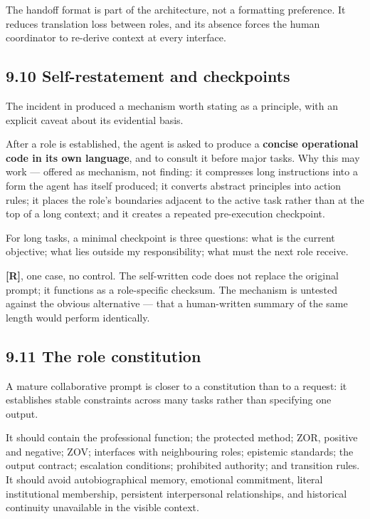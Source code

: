 The handoff format is part of the architecture, not a formatting preference. It reduces translation loss between roles, and its absence forces the human coordinator to re-derive context at every interface.


\subsection*{9.10 Self-restatement and checkpoints}
\label{sec:en:9.10}

The incident in  produced a mechanism worth stating as a principle, with an explicit caveat about its evidential basis.

After a role is established, the agent is asked to produce a \textbf{concise operational code in its own language}, and to consult it before major tasks. Why this may work — offered as mechanism, not finding: it compresses long instructions into a form the agent has itself produced; it converts abstract principles into action rules; it places the role's boundaries adjacent to the active task rather than at the top of a long context; and it creates a repeated pre-execution checkpoint.

For long tasks, a minimal checkpoint is three questions: what is the current objective; what lies outside my responsibility; what must the next role receive.

\textbf{[R]}, one case, no control. The self-written code does not replace the original prompt; it functions as a role-specific checksum. The mechanism is untested against the obvious alternative — that a human-written summary of the same length would perform identically.


\subsection*{9.11 The role constitution}
\label{sec:en:9.11}

A mature collaborative prompt is closer to a constitution than to a request: it establishes stable constraints across many tasks rather than specifying one output.

It should contain the professional function; the protected method; ZOR, positive and negative; ZOV; interfaces with neighbouring roles; epistemic standards; the output contract; escalation conditions; prohibited authority; and transition rules. It should avoid autobiographical memory, emotional commitment, literal institutional membership, persistent interpersonal relationships, and historical continuity unavailable in the visible context.

